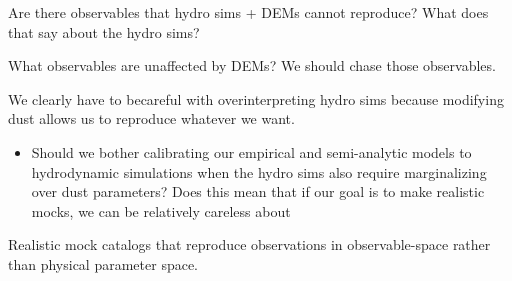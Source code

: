 
Are there observables that hydro sims + DEMs cannot reproduce? What does that say about the hydro sims?

What observables are unaffected by DEMs? We should chase those observables. 

We clearly have to becareful with overinterpreting hydro sims because modifying
dust allows us to reproduce whatever we want. 
\begin{itemize}
    \item Should we bother calibrating our empirical and semi-analytic models
        to hydrodynamic simulations when the hydro sims also require
        marginalizing over dust parameters? Does this mean that if our goal is
        to make realistic mocks, we can be relatively careless about 
\end{itemize}


Realistic mock catalogs that reproduce observations in observable-space rather
than physical parameter space.  


